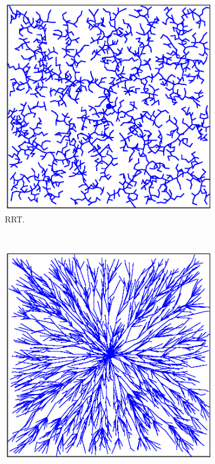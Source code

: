 \documentclass{ctuthesis}
\begin{document}
\begin{figure}[!ht]
  \centering
  \begin{subfigure}[b]{0.45\textwidth}
      \includegraphics[width=\textwidth]{figChap3/2RRTexpansion2000.eps}
      \caption{RRT.}
      \label{fig:rrt2k}
  \end{subfigure}
  ~ %
  \begin{subfigure}[b]{0.45\textwidth}
      \includegraphics[width=\textwidth]{figChap3/RRTstar_expansion2000.eps}

\end{subfigure}
\end{figure}
\end{document}
